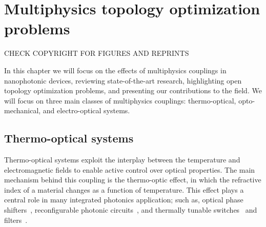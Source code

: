 \chapter{Multiphysics topology optimization problems}

CHECK COPYRIGHT FOR FIGURES AND REPRINTS

In this chapter we will focus on the effects of multiphysics couplings in nanophotonic devices, reviewing state-of-the-art research, 
highlighting open topology optimization problems, and presenting our contributions to the field.
We will focus on three main classes of multiphysics couplings: thermo-optical, opto-mechanical, and electro-optical systems.








\section{Thermo-optical systems~\cite{ownpub0}}\label{sec:thermo_optical}

Thermo-optical systems exploit the interplay between the temperature and electromagnetic fields to enable active control over optical properties. 
The main mechanism behind this coupling is the thermo-optic effect, 
in which the refractive index of a material changes as a function of temperature. 
This effect plays a central role in many integrated photonics application; such as,
 optical phase shifters~\cite{TOPS_1, TOPS_2, TOPS_3}, reconfigurable photonic circuits~\cite{program, PIC}, and thermally tunable switches~\cite{switch, switch_2} and filters~\cite{filter}.

